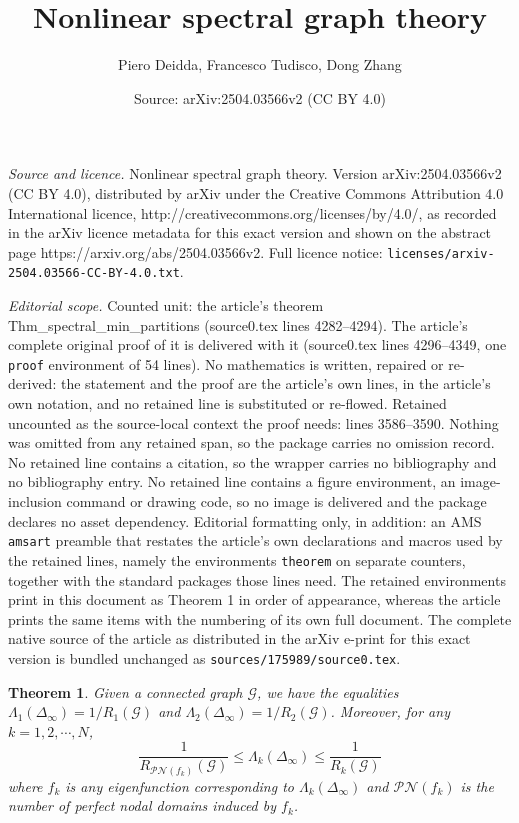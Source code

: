 \documentclass[10pt,a4paper]{amsart}
\title{Nonlinear spectral graph theory}
\author{Piero Deidda, Francesco Tudisco, Dong Zhang}
\date{Source: arXiv:2504.03566v2 (CC BY 4.0)}
\newtheorem{theorem}{Theorem}
\newcommand{\Gc}{\mathcal{G}}
\newcommand{\PNc}{\mathcal{PN}}
\newcommand{\inflap}{\Delta_{\infty}}
\begin{document}
\maketitle

\noindent\emph{Source and licence.} Nonlinear spectral graph theory. Version arXiv:2504.03566v2 (CC BY 4.0), distributed by arXiv under the Creative Commons Attribution 4.0 International licence, http://creativecommons.org/licenses/by/4.0/, as recorded in the arXiv licence metadata for this exact version and shown on the abstract page https://arxiv.org/abs/2504.03566v2. Full licence notice: \texttt{licenses/arxiv-2504.03566-CC-BY-4.0.txt}.\par\smallskip

\noindent\textit{Editorial scope.} Counted unit: the article's theorem Thm\_spectral\_min\_partitions (source0.tex lines 4282--4294). The article's complete original proof of it is delivered with it (source0.tex lines 4296--4349, one \texttt{proof} environment of 54 lines). No mathematics is written, repaired or re-derived: the statement and the proof are the article's own lines, in the article's own notation, and no retained line is substituted or re-flowed.  Retained uncounted as the source-local context the proof needs: lines 3586--3590.  Nothing was omitted from any retained span, so the package carries no omission record.  No retained line contains a citation, so the wrapper carries no bibliography and no bibliography entry.  No retained line contains a figure environment, an image-inclusion command or drawing code, so no image is delivered and the package declares no asset dependency.  Editorial formatting only, in addition: an AMS \texttt{amsart} preamble that restates the article's own declarations and macros used by the retained lines, namely the environments \texttt{theorem} on separate counters, together with the standard packages those lines need.  The retained environments print in this document as Theorem 1 in order of appearance, whereas the article prints the same items with the numbering of its own full document.  The complete native source of the article as distributed in the arXiv e-print for this exact version is bundled unchanged as \texttt{sources/175989/source0.tex}.
\begin{theorem}\label{thm:k-inequality}
Given a connected graph $\Gc$, we have the equalities  $\Lambda_1(\inflap)=1/R_1(\Gc)$ and $\Lambda_2(\inflap)=1/R_2(\Gc)$. Moreover, for any $k=1,2,\cdots,N$,
$$\frac{1}{R_{\PNc(f_k)}(\Gc)}\le \Lambda_k(\inflap)\le \frac{1}{R_k(\Gc)}$$ 
 where $f_k$ is any eigenfunction corresponding to $\Lambda_k(\inflap)$ and $\PNc(f_k)$ is the number of perfect nodal domains induced by $f_k$. 
\end{theorem}
\end{document}
